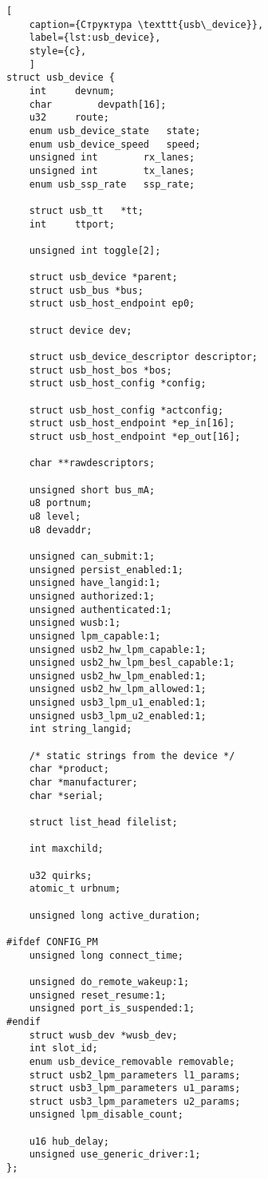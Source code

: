 \begin{lstlisting}[
	caption={Структура \texttt{usb\_device}},
	label={lst:usb_device},
	style={c},
	]
struct usb_device {
	int		devnum;
	char		devpath[16];
	u32		route;
	enum usb_device_state	state;
	enum usb_device_speed	speed;
	unsigned int		rx_lanes;
	unsigned int		tx_lanes;
	enum usb_ssp_rate	ssp_rate;
	
	struct usb_tt	*tt;
	int		ttport;
	
	unsigned int toggle[2];
	
	struct usb_device *parent;
	struct usb_bus *bus;
	struct usb_host_endpoint ep0;
	
	struct device dev;
	
	struct usb_device_descriptor descriptor;
	struct usb_host_bos *bos;
	struct usb_host_config *config;
	
	struct usb_host_config *actconfig;
	struct usb_host_endpoint *ep_in[16];
	struct usb_host_endpoint *ep_out[16];
	
	char **rawdescriptors;
	
	unsigned short bus_mA;
	u8 portnum;
	u8 level;
	u8 devaddr;
	
	unsigned can_submit:1;
	unsigned persist_enabled:1;
	unsigned have_langid:1;
	unsigned authorized:1;
	unsigned authenticated:1;
	unsigned wusb:1;
	unsigned lpm_capable:1;
	unsigned usb2_hw_lpm_capable:1;
	unsigned usb2_hw_lpm_besl_capable:1;
	unsigned usb2_hw_lpm_enabled:1;
	unsigned usb2_hw_lpm_allowed:1;
	unsigned usb3_lpm_u1_enabled:1;
	unsigned usb3_lpm_u2_enabled:1;
	int string_langid;
	
	/* static strings from the device */
	char *product;
	char *manufacturer;
	char *serial;
	
	struct list_head filelist;
	
	int maxchild;
	
	u32 quirks;
	atomic_t urbnum;
	
	unsigned long active_duration;
	
#ifdef CONFIG_PM
	unsigned long connect_time;
	
	unsigned do_remote_wakeup:1;
	unsigned reset_resume:1;
	unsigned port_is_suspended:1;
#endif
	struct wusb_dev *wusb_dev;
	int slot_id;
	enum usb_device_removable removable;
	struct usb2_lpm_parameters l1_params;
	struct usb3_lpm_parameters u1_params;
	struct usb3_lpm_parameters u2_params;
	unsigned lpm_disable_count;
	
	u16 hub_delay;
	unsigned use_generic_driver:1;
};
\end{lstlisting}

